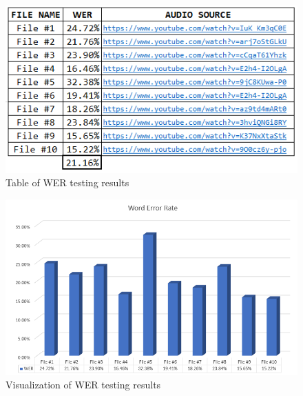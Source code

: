 \documentclass{article}
\begin{document}
\vspace{20pt}
\begin{figure}[H]
  \centering
  \includegraphics[scale=1]{implementation/STT Evaluation - WER.png}
  \caption{Table of WER testing results}
  \label{fig:WERtable}
\end{figure}

\vspace{-20pt}

\begin{figure}[H]
  \centering
  \includegraphics[scale=0.78]{implementation/WERchart.png}
  \caption{Visualization of WER testing results}
  \label{fig:WERchart}
\end{figure}

\vspace{-20pt}
\end{document}
